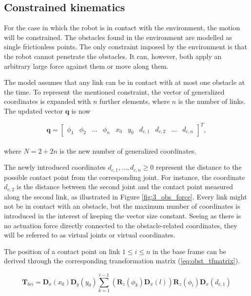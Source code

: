 
\subsection{Constrained kinematics}\label{seq:constr_kin}

For the case in which the robot is in contact with the environment, the motion will be constrained. The obstacles found in the environment are modelled as single frictionless points. The only constraint imposed by the environment is that the robot cannot penetrate the obstacles. It can, however, both apply an arbitrary large force against them or move along them.

The model assumes that any link can be in contact with at most one obstacle at the time. To represent the mentioned constraint, the vector of generalized coordinates is expanded with $n$ further elements, where $n$ is the number of links. The updated vector $\mathbf{q}$ is now

\begin{equation} \label{eq:q2}
    \mathbf{q} = 
    \begin{bmatrix}
        \phi_1 & \phi_2 & ... & \phi_n & x_0 & y_0 & d_{c,1} & d_{c,2} & ... & d_{c,n}
    \end{bmatrix}^T,
\end{equation}
\\
where $N = 2 + 2n$ is the new number of generalized coordinates.

The newly introduced coordinates $d_{c,1}, ... , d_{c,n} \geq 0$ represent the distance to the possible contact point from the corresponding joint. For instance, the coordinate $d_{c,2}$ is the distance between the second joint and the contact point measured along the second link, as illustrated in Figure \ref{fig:3_obs_force}. Every link might not be in contact with an obstacle, but the maximum number of coordinates is introduced in the interest of keeping the vector size constant. 
Seeing as there is no actuation force directly connected to the obstacle-related coordinates, they will be referred to as virtual joints or virtual coordinates.

The position of a contact point on link $1\leq i\leq n$ in the base frame can be derived through the corresponding transformation matrix (\ref{eq:obst_tfmatrix}).

\begin{equation} \label{eq:obst_tfmatrix}
    \textbf{T}_{b ci} = \textbf{D}_x(x_0) \textbf{D}_y(y_0) \sum_{k=1}^{i-1} (\textbf{R}_z(\phi_k) \textbf{D}_x(l)) \textbf{R}_z(\phi_i) \textbf{D}_x(d_{c,1})
\end{equation}

